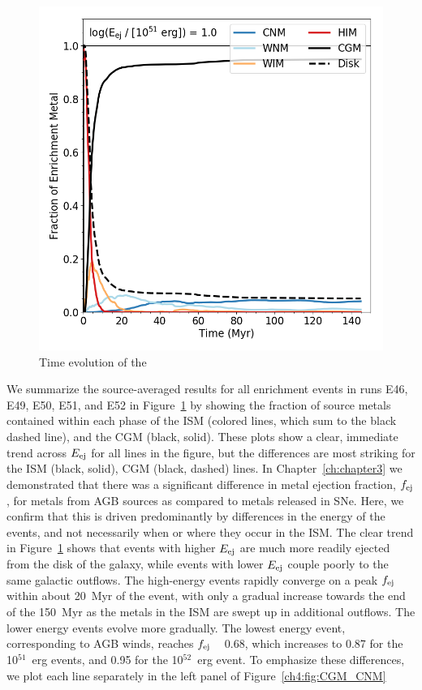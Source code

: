\begin{figure}
\includegraphics[width=0.45\linewidth]{figures/ch4/HNE1_enrichment_evolution_average_CGM}
\caption{Time evolution of the }
\label{ch4:fig:ISM_CGM}
\end{figure}

We summarize the source-averaged results for all enrichment events in runs \runone E46, \runone E49, \runone E50, \runone E51, and \runone E52 in Figure~\ref{ch4:fig:ISM_CGM} by showing the fraction of source metals contained within each phase of the ISM (colored lines, which sum to the black dashed line), and the CGM (black, solid). These plots show a clear, immediate trend across $E_{\rm ej}$ for all lines in the figure, but the differences are most striking for the ISM (black, solid), CGM (black, dashed) lines. In Chapter~\ref{ch:chapter3}
we demonstrated that there was a significant difference in metal ejection fraction, $f_{\rm ej}$, for metals from AGB sources as compared to metals released in SNe. Here, we confirm that this is driven predominantly by differences in the energy of the events, and not necessarily when or where they occur in the ISM. The clear trend in Figure~\ref{ch4:fig:ISM_CGM} shows that events with higher $E_{\rm ej}$ are much more readily ejected from the disk of the galaxy, while events with lower $E_{\rm ej}$ couple poorly to the same galactic outflows.
The high-energy events rapidly converge on a peak $f_{\rm ej}$ within about 20~Myr of the event, with only a gradual increase towards the end of the 150~Myr as the metals in the ISM are swept up in additional outflows. The lower energy events evolve more gradually. The lowest energy event, corresponding to AGB winds, reaches $f_{\rm ej}$ ~ 0.68, which increases to 0.87 for the 10$^{51}$~erg events, and 0.95 for the 10$^{52}$~erg event. To emphasize these differences, we plot each line separately in the left panel of Figure~\ref{ch4:fig:CGM_CNM}

